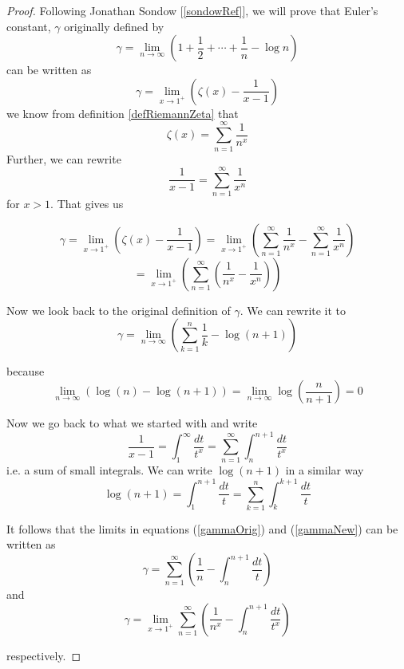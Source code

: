 \documentclass{article}
\theoremstyle{definition}
\theoremstyle{remark}
\begin{document}
\begin{proof}
Following Jonathan Sondow [\ref{sondowRef}], we will prove that Euler's constant, $\gamma $ originally defined by
\begin{equation} \label{gammaOrig}
\gamma = \lim_{n \rightarrow \infty} \left( 1 + \frac{1}{2} + \cdots + \frac{1}{n} - \log n \right)
\end{equation}
can be written as
\begin{equation} \label{gammaNew}
 \gamma = \lim_{x \rightarrow 1^+} \left( \zeta(x) - \frac{1}{x-1} \right)
 \end{equation}
we know from definition \ref{defRiemannZeta} that
$$ \zeta(x) = \sum_{n=1}^{\infty} \frac{1}{n^x}$$
Further, we can rewrite
$$\frac{1}{x-1} = \sum_{n=1}^{\infty} \frac{1}{x^n}$$ for $x>1$. That gives us

$$ \gamma = \lim_{x \rightarrow 1^+} \left( \zeta(x) - \frac{1}{x-1} \right) = \lim_{x \rightarrow 1^+} \left( \sum_{n=1}^{\infty} \frac{1}{n^x} - \sum_{n=1}^{\infty} \frac{1}{x^n}\right)$$
$$ = \lim_{x \rightarrow 1^+}\left( \sum_{n=1}^{\infty} \left( \frac{1}{n^x} - \frac{1}{x^n} \right)\right)$$

Now we look back to the original definition of $\gamma$. We can rewrite it to $$ \gamma = \lim_{n\rightarrow \infty} \left( \sum_{k=1}^{n} \frac{1}{k} - \log(n+1) \right)$$

because
$$ \lim_{n\rightarrow \infty} \left(\log(n) - \log(n+1)\right) = \lim_{n\rightarrow \infty} \log\left( \frac{n}{n+1} \right) = 0$$

Now we go back to what we started with and write
$$ \frac{1}{x-1} = \int_{1}^{\infty} \frac{dt}{t^x} = \sum_{n=1}^{\infty}\int_{n}^{n+1} \frac{dt}{t^x} $$ i.e. a sum of small integrals. We can write $\log(n+1)$ in a similar way
$$ \log(n+1) = \int_{1}^{n+1}\frac{dt}{t} = \sum_{k=1}^{n} \int_{k}^{k+1} \frac{dt}{t}$$

It follows that the limits in equations (\ref{gammaOrig}) and (\ref{gammaNew}) can be written as
\begin{equation}
\gamma = \sum_{n=1}^{\infty}\left(\frac{1}{n}-\int_{n}^{n+1}\frac{dt}{t}\right)
\end{equation}
and
\begin{equation}
\gamma = \lim_{x \rightarrow 1^+} \sum_{n=1}^{\infty}\left(\frac{1}{n^x}-\int_{n}^{n+1}\frac{dt}{t^x}\right)
\end{equation}

respectively.

\end{proof}
\newpage
\end{document}
